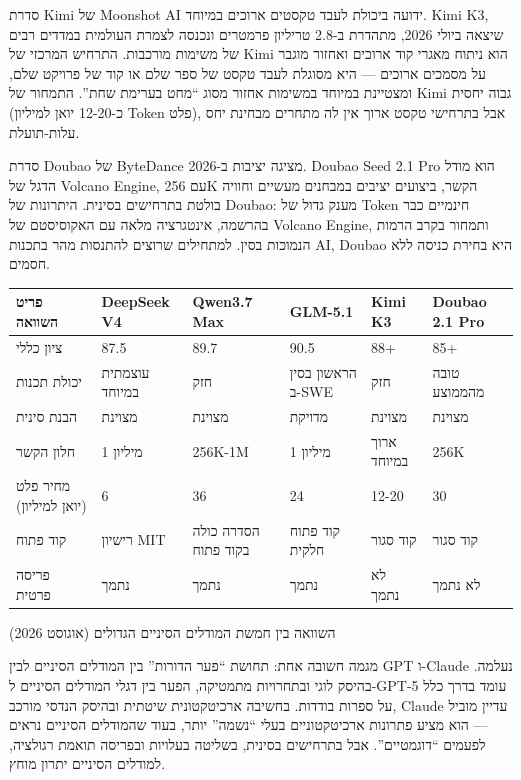 
סדרת Kimi של Moonshot AI ידועה ביכולת לעבד טקסטים ארוכים במיוחד. Kimi K3, שיצאה ביולי 2026, מתהדרת ב-2.8 טריליון פרמטרים ונכנסה לצמרת העולמית במדדים רבים של משימות מורכבות. התרחיש המרכזי של Kimi הוא ניתוח מאגרי קוד ארוכים ואחזור מוגבר על מסמכים ארוכים — היא מסוגלת לעבד טקסט של ספר שלם או קוד של פרויקט שלם, ומצטיינת במיוחד במשימות אחזור מסוג “מחט בערימת שחת”. התמחור של Kimi גבוה יחסית (כ-12-20 יואן למיליון Token פלט), אבל בתרחישי טקסט ארוך אין לה מתחרים מבחינת יחס עלות-תועלת.


סדרת Doubao של ByteDance מציגה יציבות ב-2026. Doubao Seed 2.1 Pro הוא מודל הדגל של Volcano Engine, עם 256K הקשר, ביצועים יציבים במבחנים מעשיים וחוויה בולטת בתרחישים בסינית. היתרונות של Doubao: מענק גדול של Token חינמיים כבר בהרשמה, אינטגרציה מלאה עם האקוסיסטם של Volcano Engine, ותמחור בקרב הרמות הנמוכות בסין. למתחילים שרוצים להתנסות מהר בתכנות AI, Doubao היא בחירת כניסה ללא חסמים.

\begin{center}
\begin{tabularx}{\linewidth}{|X|X|X|X|X|X|}
\hline
\textbf{פריט השוואה} & \textbf{DeepSeek V4} & \textbf{Qwen3.7 Max} & \textbf{GLM-5.1} & \textbf{Kimi K3} & \textbf{Doubao 2.1 Pro} \tabularnewline
\hline
ציון כללי & 87.5 & 89.7 & 90.5 & 88+ & 85+ \tabularnewline
יכולת תכנות & עוצמתית במיוחד & חזק & הראשון בסין ב-SWE & חזק & טובה מהממוצע \tabularnewline
הבנת סינית & מצוינת & מצוינת & מדויקת & מצוינת & מצוינת \tabularnewline
חלון הקשר & 1 מיליון & 256K-1M & 1 מיליון & ארוך במיוחד & 256K \tabularnewline
מחיר פלט (יואן למיליון) & 6 & 36 & 24 & 12-20 & 30 \tabularnewline
קוד פתוח & רישיון MIT & הסדרה כולה בקוד פתוח & קוד פתוח חלקית & קוד סגור & קוד סגור \tabularnewline
פריסה פרטית & נתמך & נתמך & נתמך & לא נתמך & לא נתמך \tabularnewline
\hline
\end{tabularx}
\end{center}

\begin{center}\small\color{gray}השוואה בין חמשת המודלים הסיניים הגדולים (אוגוסט 2026)\end{center}

מגמה חשובה אחת: תחושת “פער הדורות” בין המודלים הסיניים לבין GPT ו-Claude נעלמה. בהיסק לוגי ובתחרויות מתמטיקה, הפער בין דגלי המודלים הסיניים ל-GPT-5 עומד בדרך כלל על ספרות בודדות. בחשיבה ארכיטקטונית שיטתית ובהיסק הנדסי מורכב, Claude עדיין מוביל — הוא מציע פתרונות ארכיטקטוניים בעלי “נשמה” יותר, בעוד שהמודלים הסיניים נראים לפעמים “דוגמטיים”. אבל בתרחישים בסינית, בשליטה בעלויות ובפריסה תואמת רגולציה, למודלים הסיניים יתרון מוחץ.

